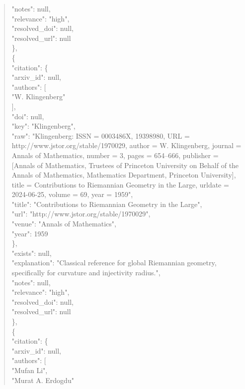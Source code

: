 \documentclass[11pt]{article}
\begin{document}
\begin{quote}
      "notes": null,\\
      "relevance": "high",\\
      "resolved\_doi": null,\\
      "resolved\_url": null\\
    \},\\
    \{\\
      "citation": \{\\
        "arxiv\_id": null,\\
        "authors": [\\
          "W. Klingenberg"\\
        ],\\
        "doi": null,\\
        "key": "Klingenberg",\\
        "raw": "Klingenberg: ISSN = 0003486X, 19398980, URL = http://www.jstor.org/stable/1970029, author = W. Klingenberg, journal = Annals of Mathematics, number = 3, pages = 654--666, publisher = [Annals of Mathematics, Trustees of Princeton University on Behalf of the Annals of Mathematics, Mathematics Department, Princeton University], title = Contributions to Riemannian Geometry in the Large, urldate = 2024-06-25, volume = 69, year = 1959",\\
        "title": "Contributions to Riemannian Geometry in the Large",\\
        "url": "http://www.jstor.org/stable/1970029",\\
        "venue": "Annals of Mathematics",\\
        "year": 1959\\
      \},\\
      "exists": null,\\
      "explanation": "Classical reference for global Riemannian geometry, specifically for curvature and injectivity radius.",\\
      "notes": null,\\
      "relevance": "high",\\
      "resolved\_doi": null,\\
      "resolved\_url": null\\
    \},\\
    \{\\
      "citation": \{\\
        "arxiv\_id": null,\\
        "authors": [\\
          "Mufan Li",\\
          "Murat A. Erdogdu"\\

\end{quote}
\end{document}
